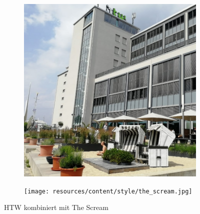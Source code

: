 \begin{figure}[H]
    \centering
    \begin{subfigure}[h]{0.20\textwidth}
        \centering
        \includegraphics[width=\textwidth]{resources/content/content/htw-768x768.jpg}
    \end{subfigure}
    \begin{subfigure}[h]{0.20\textwidth}
        \centering
        \texttt{[image: resources/content/style/the\_scream.jpg]}
    \end{subfigure}
    \caption{HTW kombiniert mit The Scream}
\end{figure}

